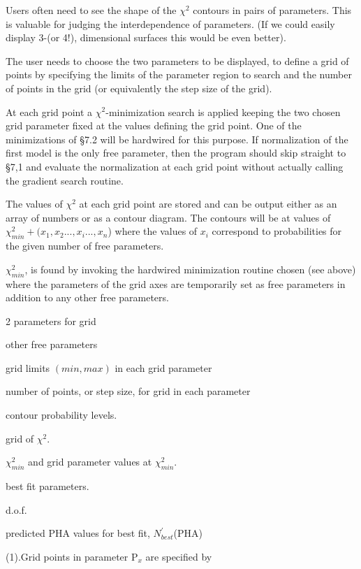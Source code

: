 {\listlist


Users often need to see the shape of the $\chi^{2}$ contours in pairs
of parameters.  This is valuable for judging the interdependence of
parameters.  (If we could easily display 3-(or 4!), dimensional
surfaces this would be even better).

The user needs to choose the two parameters to be displayed, to define
a grid of points by specifying the limits of the parameter region to
search and the number of points in the grid (or equivalently the step size
of the grid).

At each grid point a $\chi^{2}$-minimization search
is applied keeping the two chosen grid parameter fixed
at the values defining the grid point.  One of the minimizations of
\S 7.2 will be hardwired for this purpose.
If normalization of the first model is the only free parameter,
then the program should skip straight to \S7,1 and evaluate the
normalization at each grid point without actually calling the gradient
search routine.

The values of $\chi^{2}$ at each grid point are stored and can be output
either as an array of numbers or as a contour diagram.  The contours
will be at values of $\chi_{min}^{2} + (x_{1},x_{2}...,x_{i}...,x_{n}$) where
the values of $x_{i}$ correspond to probabilities for the given number of
free parameters.

$\chi_{min}^{2}$, is found by invoking the hardwired minimization
routine
chosen (see above) where the parameters of the grid axes are
temporarily set as free parameters in addition to any other free
parameters.


2 parameters for grid
 
other free parameters
 
grid limits $(min,max)$ in each grid parameter
 
number of points, or step size, for grid in each parameter
 
contour probability levels.
 

grid of $\chi^{2}$.

$\chi_{min}^{2}$ and grid parameter values at $\chi_{min}^{2}$.
 
best fit parameters.
 
d.o.f.
 
predicted PHA values for best fit, $N^{\prime}_{best}$(PHA)
 
 
(1).Grid points in parameter P$_{x}$ are specified by

}
\vskip 12pt
{\parindent \vbox{}}

